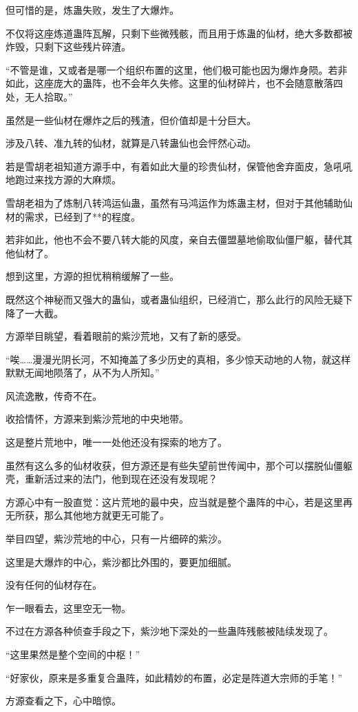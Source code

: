 \begin{this_body}
但可惜的是，炼蛊失败，发生了大爆炸。

不仅将这座炼道蛊阵瓦解，只剩下些微残骸，而且用于炼蛊的仙材，绝大多数都被炸毁，只剩下这些残片碎渣。

“不管是谁，又或者是哪一个组织布置的这里，他们极可能也因为爆炸身陨。若非如此，这座庞大的蛊阵，也不会年久失修。这里的仙材碎片，也不会随意散落四处，无人拾取。”

虽然是一些仙材在爆炸之后的残渣，但价值却是十分巨大。

涉及八转、准九转的仙材，就算是八转蛊仙也会怦然心动。

若是雪胡老祖知道方源手中，有着如此大量的珍贵仙材，保管他舍弃面皮，急吼吼地跑过来找方源的大麻烦。

雪胡老祖为了炼制八转鸿运仙蛊，虽然有马鸿运作为炼蛊主材，但对于其他辅助仙材的需求，已经到了**的程度。

若非如此，他也不会不要八转大能的风度，亲自去僵盟墓地偷取仙僵尸躯，替代其他仙材了。

想到这里，方源的担忧稍稍缓解了一些。

既然这个神秘而又强大的蛊仙，或者蛊仙组织，已经消亡，那么此行的风险无疑下降了一大截。

方源举目眺望，看着眼前的紫沙荒地，又有了新的感受。

“唉……漫漫光阴长河，不知掩盖了多少历史的真相，多少惊天动地的人物，就这样默默无闻地陨落了，从不为人所知。”

风流逸散，传奇不在。

收拾情怀，方源来到紫沙荒地的中央地带。

这是整片荒地中，唯一一处他还没有探索的地方了。

虽然有这么多的仙材收获，但方源还是有些失望前世传闻中，那个可以摆脱仙僵躯壳，重新活过来的法门，他到现在还没有发现呢？

方源心中有一股直觉：这片荒地的最中央，应当就是整个蛊阵的中心，若是这里再无所获，那么其他地方就更无可能了。

举目四望，紫沙荒地的中心，只有一片细碎的紫沙。

这里是大爆炸的中心，紫沙都比外围的，要更加细腻。

没有任何的仙材存在。

乍一眼看去，这里空无一物。

不过在方源各种侦查手段之下，紫沙地下深处的一些蛊阵残骸被陆续发现了。

“这里果然是整个空间的中枢！”

“好家伙，原来是多重复合蛊阵，如此精妙的布置，必定是阵道大宗师的手笔！”

方源查看之下，心中暗惊。


\end{this_body}
